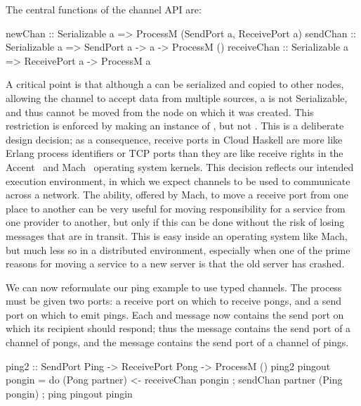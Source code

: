 \documentclass[preprint]{sigplanconf}
\begin{document}
The central functions of the channel API are:
\par{\small
\begin{code}
newChan  :: Serializable a 
         => ProcessM (SendPort a, ReceivePort a)
sendChan :: Serializable a => SendPort a -> a -> ProcessM ()
receiveChan :: Serializable a => ReceivePort a -> ProcessM a
\end{code}}

A critical point is that although a  can be serialized and copied to other nodes, allowing the channel to accept data from multiple sources, a  is not Serializable, and thus cannot be moved from the node on which it was created.
This restriction is enforced by making  an instance of , but not . 
This is a deliberate design decision; as a consequence, receive ports in Cloud Haskell are more like Erlang process identifiers or TCP ports than they are like receive rights in the Accent~\cite{Rashid81} and Mach~\cite[\S4.2.3]{free-s2008} operating system kernels.   
This decision reflects our intended execution environment, in which we expect channels to be used to communicate across a network.  
The ability, offered by Mach, to move a receive port from one place to another can be very useful for moving responsibility for a service from one provider to another, but only if this can be done without the risk of losing messages that are in transit.  
This is easy inside an operating system like Mach, but much less so in a distributed environment, especially when one of the prime reasons for moving a service to a new server is that the old server has crashed.  

We can now reformulate our ping example to use typed channels. The  process must be given two ports: a receive port on which to receive pongs, and a send port on which to emit pings. Each  and  message now contains the send port on which its recipient should respond; thus the  message contains the send port of a channel of pongs, and the  message contains the send port of a channel of pings.

\begin{code}
ping2 :: SendPort Ping -> ReceivePort Pong -> ProcessM ()
ping2 pingout pongin = 
   do { (Pong partner) <- receiveChan pongin
      ; sendChan partner (Ping pongin) 
      ; ping pingout pingin }
\end{code}
\end{document}
